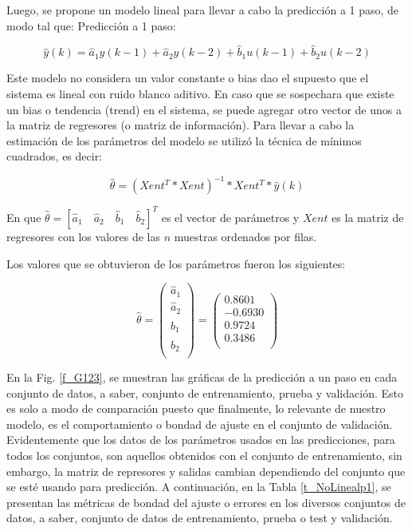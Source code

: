 \documentclass[12pt]{article}
\begin{document}
Luego, se propone un modelo lineal para llevar a cabo la predicción a 1 paso, de modo tal que:
Predicción a 1 paso:

\begin{equation}
\hat{y}(k)=\hat{a}_1 y(k-1)+\hat{a}_2 y(k-2)+\hat{b}_1 u(k-1)+\hat{b}_2 u(k-2)
\label{e_Pre1paso}
\end{equation}

Este modelo no considera un valor constante o bias dao el supuesto que el sistema es lineal con ruido blanco aditivo. En caso que se sospechara que existe un bias o tendencia (trend) en el sistema, se puede agregar otro vector de unos a la matriz de regresores (o matriz de información). Para llevar a cabo la estimación de los parámetros del modelo se utilizó la técnica de mínimos cuadrados, es decir:

\begin{equation}
\hat{\theta}=(Xent^T*Xent)^{-1}*Xent^T*\hat{y}(k)
\label{e_AjustMinCuadrados}
\end{equation}


En que $\hat{\theta}=[\hat{a}_1 \quad \hat{a}_2 \quad \hat{b}_1 \quad \hat{b}_2]^T$ es el vector de parámetros y $Xent$ es la matriz de regresores con los valores de las $n$ muestras ordenados por filas.

Los valores que se obtuvieron de los parámetros fueron los siguientes:


\begin{equation}
\hat{\theta}=\left(
                \begin{array}{c}
                  \hat{a}_1  \\
                  \hat{a}_2  \\
                  \hat{b}_1  \\
                  \hat{b}_2  \\
                \end{array}
              \right)
=\left(
   \begin{array}{c}
     0.8601 \\
     -0.6930 \\
     0.9724 \\
     0.3486 \\
   \end{array}
 \right)
\label{e_ValoresCoeficientes}
\end{equation}

En la Fig. \ref{f_G123}, se muestran las gráficas de la predicción a un paso en cada conjunto de datos, a saber, conjunto de entrenamiento, prueba y validación. Esto es solo a modo de comparación puesto que finalmente, lo relevante de nuestro modelo, es el comportamiento o bondad de ajuste en el conjunto de validación. Evidentemente que los datos de los parámetros usados en las predicciones, para todos los conjuntos, son aquellos obtenidos con el conjunto de entrenamiento, sin embargo, la matriz de represores y salidas cambian dependiendo del conjunto que se esté usando para predicción. A continuación, en la Tabla \ref{t_NoLinealp1}, se presentan las métricas de bondad del ajuste o errores en los diversos conjuntos de datos, a saber, conjunto de datos de entrenamiento, prueba o test y validación.
\end{document}
